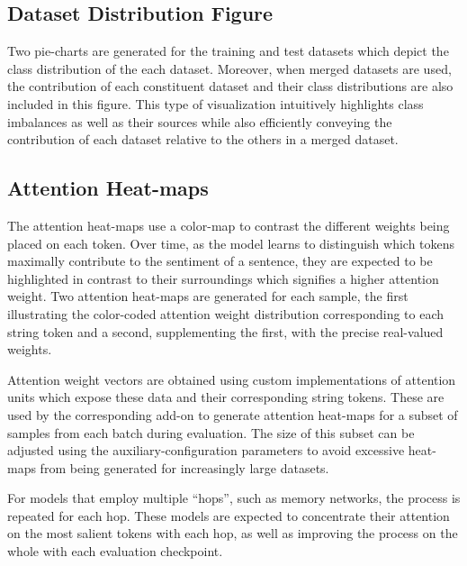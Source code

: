 \documentclass[../../fyp.tex]{subfiles}
\begin{document}
\subsection{Dataset Distribution Figure}
Two pie-charts are generated for the training and test datasets which depict the class distribution of the each dataset. Moreover, when merged datasets are used, the contribution of each constituent dataset and their class distributions are also included in this figure. This type of visualization intuitively highlights class imbalances as well as their sources while also efficiently conveying the contribution of each dataset relative to the others in a merged dataset.

\subsection{Attention Heat-maps}
The attention heat-maps use a color-map to contrast the different weights being placed on each token. Over time, as the model learns to distinguish which tokens maximally contribute to the sentiment of a sentence, they are expected to be highlighted in contrast to their surroundings which signifies a higher attention weight. Two attention heat-maps are generated for each sample, the first illustrating the color-coded attention weight distribution corresponding to each string token and a second, supplementing the first, with the precise real-valued weights.

Attention weight vectors are obtained using custom implementations of attention units which expose these data and their corresponding string tokens. These are used by the corresponding add-on to generate attention heat-maps for a subset of samples from each batch during evaluation. The size of this subset can be adjusted using the auxiliary-configuration parameters to avoid excessive heat-maps from being generated for increasingly large datasets. 

For models that employ multiple \enquote{hops}, such as memory networks, the process is repeated for each hop. These models are expected to concentrate their attention on the most salient tokens with each hop, as well as improving the process on the whole with each evaluation checkpoint.
\end{document}
